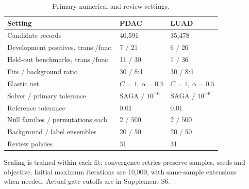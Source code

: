 \begin{table}[!tbp]
\centering\small
\caption{Primary numerical and review settings.}\label{tab:fixed-settings}
\begin{tabularx}{\textwidth}{p{}YY}\toprule
Setting & PDAC & LUAD \\ \midrule
Candidate records & 40,591 & 35,478 \\
Development positives, trans./func. & 7 / 21 & 6 / 26 \\
Held-out benchmarks, trans./func. & 11 / 30 & 7 / 36 \\
Fits / background ratio & 30 / 8:1 & 30 / 8:1 \\
Elastic net & $C=1,\ \alpha=0.5$ & $C=1,\ \alpha=0.5$ \\
Solver / primary tolerance & SAGA / $10^{-6}$ & SAGA / $10^{-6}$ \\
Reference tolerance & 0.01 & 0.01 \\
Null families / permutations each & 2 / 500 & 2 / 500 \\
Background / label ensembles & 20 / 50 & 20 / 50 \\
Review policies & 31 & 31 \\
\bottomrule\end{tabularx}
\parbox{\textwidth}{\footnotesize Scaling is trained within each fit; convergence retries preserve samples, seeds and objective. Initial maximum iterations are 10,000, with same-sample extensions when needed. Actual gate cutoffs are in Supplement S6.}
\end{table}
